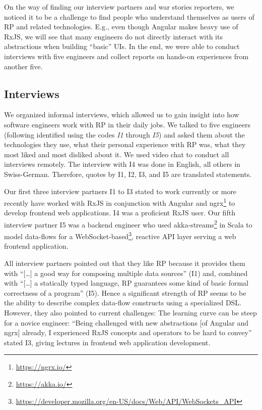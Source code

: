\documentclass[sigplan,screen,review]{acmart}
\begin{document}
On the way of finding our interview partners and war stories reporters, we noticed it to be a challenge to find people who understand themselves as users of RP and related technologies. E.g., even though Angular makes heavy use of RxJS, we will see that many engineers do not directly interact with its abstractions when building ``basic'' UIs. In the end, we were able to conduct interviews with five engineers and collect reports on hands-on experiences from another five.

\subsection{Interviews}

We organized informal interviews, which allowed us to gain insight into how software engineers work with RP in their daily jobs. We talked to five engineers (following identified using the codes \emph{I1} through \emph{I5}) and asked them about the technologies they use, what their personal experience with RP was, what they most liked and most disliked about it. We used video chat to conduct all interviews remotely. The interview with I4 was done in English, all others in Swiss-German. Therefore, quotes by I1, I2, I3, and I5 are translated statements.

Our first three interview partners I1 to I3 stated to work currently or more recently have worked with RxJS in conjunction with Angular and ngrx\footnote{\url{https://ngrx.io/}} to develop frontend web applications. I4 was a proficient RxJS user. Our fifth interview partner I5 was a backend engineer who used akka-streams\footnote{\url{https://akka.io/}} in Scala to model data-flows for a WebSocket-based\footnote{\url{https://developer.mozilla.org/en-US/docs/Web/API/WebSockets_API}}, reactive API layer serving a web frontend application.

All interview partners pointed out that they like RP because it provides them with ``[\dots] a good way for composing multiple data sources'' (I1) and, combined with ``[\dots] a statically typed language, RP guarantees some kind of basic formal correctness of a program'' (I5). Hence a significant strength of RP seems to be the ability to describe complex data-flow constructs using a specialized DSL. However, they also pointed to current challenges: The learning curve can be steep for a novice engineer: ``Being challenged with new abstractions [of Angular and ngrx] already, I experienced RxJS concepts and operators to be hard to convey'' stated I3, giving lectures in frontend web application development.
\end{document}
